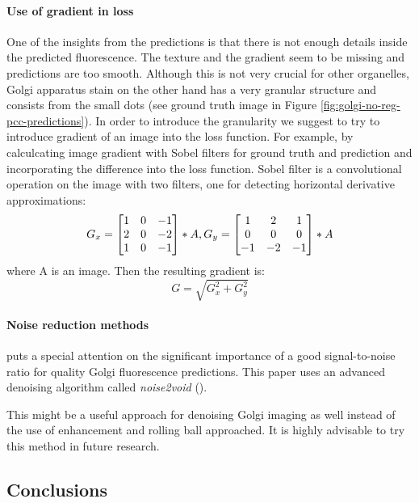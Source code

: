         \paragraph{Use of gradient in loss}
            One of the insights from the predictions is that there is not enough details inside the predicted fluorescence. The texture and the gradient seem to be missing and predictions are too smooth. Although this is not very crucial for other organelles, Golgi apparatus stain on the other hand has a very granular structure and consists from the small dots (see ground truth image in Figure \ref{fig:golgi-no-reg-pcc-predictions}). In order to introduce the granularity we suggest to try to introduce gradient of an image into the loss function. For example, by calculcating image gradient with Sobel filters for ground truth and prediction and incorporating the difference into the loss function. Sobel filter is a convolutional operation on the image with two filters, one for detecting horizontal derivative approximations:
            \begin{equation}
                G_x = \begin{bmatrix}
                    1 & 0 & -1\\
                    2 & 0 & -2\\
                    1 & 0 & -1
                    \end{bmatrix} * A, \smallskip
                G_y = \begin{bmatrix}
                    1 & 2 & 1\\
                    0 & 0 & 0\\
                    -1 & -2 & -1
                \end{bmatrix} * A
            \end{equation}
            where A is an image. Then the resulting gradient is:
            \begin{equation}
                G = \sqrt{G_x^2 + G_y^2}
            \end{equation}
        \paragraph{Noise reduction methods}
            \cite{Cheng_2021} puts a special attention on the significant importance of a good signal-to-noise ratio for quality Golgi fluorescence predictions. This paper uses an advanced denoising algorithm called \textit{noise2void} (\cite{noise2void}). 

            This might be a useful approach for denoising Golgi imaging as well instead of the use of enhancement and rolling ball approached. It is highly advisable to try this method in future research.

    \subsection{Conclusions}
        